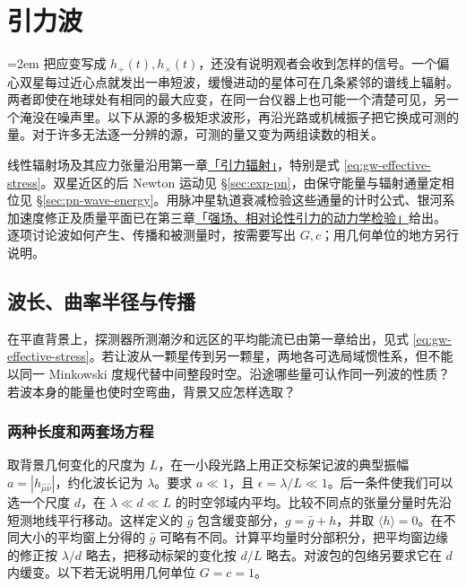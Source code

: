 \chapter{引力波}\label{chpt:gw}
\begingroup\emergencystretch=2em
把应变写成 $h_+(t),h_\times(t)$，还没有说明观者会收到怎样的信号。一个偏心双星每过近心点就发出一串短波，缓慢进动的星体可在几条紧邻的谱线上辐射。两者即使在地球处有相同的最大应变，在同一台仪器上也可能一个清楚可见，另一个淹没在噪声里。以下从源的多极矩求波形，再沿光路或机械振子把它换成可测的量。对于许多无法逐一分辨的源，可测的量又变为两组读数的相关。

线性辐射场及其应力张量沿用第一章\hyperlink{subsection.1.2.4}{「引力辐射」}，特别是式 \eqref{eq:gw-effective-stress}。双星近区的后 Newton 运动见 \S\ref{sec:exp-pn}，由保守能量与辐射通量定相位见 \S\ref{sec:pn-wave-energy}。用脉冲星轨道衰减检验这些通量的计时公式、银河系加速度修正及质量平面已在第三章\hyperlink{section.3.13}{「强场、相对论性引力的动力学检验」}给出。
逐项讨论波如何产生、传播和被测量时，按需要写出 $G,c$；用几何单位的地方另行说明。

\section{波长、曲率半径与传播}\label{sec:gw-a-optics}

在平直背景上，探测器所测潮汐和远区的平均能流已由第一章给出，见式 \eqref{eq:gw-effective-stress}。若让波从一颗星传到另一颗星，两地各可选局域惯性系，但不能以同一 Minkowski 度规代替中间整段时空。沿途哪些量可认作同一列波的性质？若波本身的能量也使时空弯曲，背景又应怎样选取？

\subsection{两种长度和两套场方程}

取背景几何变化的尺度为 $L$，在一小段光路上用正交标架记波的典型振幅 $a=|h_{\hat\mu\hat\nu}|$，约化波长记为 $\lambda$。要求 $a\ll1$，且 $\epsilon=\lambda/L\ll1$。后一条件使我们可以选一个尺度 $d$，在 $\lambda\ll d\ll L$ 的时空邻域内平均。比较不同点的张量分量时先沿短测地线平行移动。这样定义的 $\bar g$ 包含缓变部分，$g=\bar g+h$，并取 $\langle h\rangle=0$。在不同大小的平均窗上分得的 $\bar g$ 可略有不同。计算平均量时分部积分，把平均窗边缘的修正按 $\lambda/d$ 略去，把移动标架的变化按 $d/L$ 略去。对波包的包络另要求它在 $d$ 内缓变。以下若无说明用几何单位 $G=c=1$。

